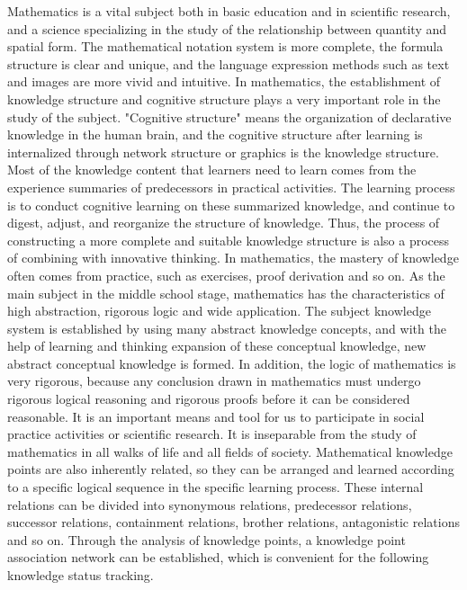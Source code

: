 Mathematics is a vital subject both in basic education and in scientific research, and a science specializing in the study of the relationship between quantity and spatial form. The mathematical notation system is more complete, the formula structure is clear and unique, and the language expression methods such as text and images are more vivid and intuitive. In mathematics, the establishment of knowledge structure and cognitive structure plays a very important role in the study of the subject. "Cognitive structure" means the organization of declarative knowledge in the human brain, and the cognitive structure after learning is internalized through network structure or graphics is the knowledge structure\cite{tanujaya2017relationship}. Most of the knowledge content that learners need to learn comes from the experience summaries of predecessors in practical activities. The learning process is to conduct cognitive learning on these summarized knowledge, and continue to digest, adjust, and reorganize the structure of knowledge. Thus, the process of constructing a more complete and suitable knowledge structure is also a process of combining with innovative thinking. In mathematics, the mastery of knowledge often comes from practice, such as exercises, proof derivation and so on. As the main subject in the middle school stage, mathematics has the characteristics of high abstraction, rigorous logic and wide application. The subject knowledge system is established by using many abstract knowledge concepts, and with the help of learning and thinking expansion of these conceptual knowledge, new abstract conceptual knowledge is formed. In addition, the logic of mathematics is very rigorous, because any conclusion drawn in mathematics must undergo rigorous logical reasoning and rigorous proofs before it can be considered reasonable. It is an important means and tool for us to participate in social practice activities or scientific research. It is inseparable from the study of mathematics in all walks of life and all fields of society. Mathematical knowledge points are also inherently related, so they can be arranged and learned according to a specific logical sequence in the specific learning process. These internal relations can be divided into synonymous relations, predecessor relations, successor relations, containment relations, brother relations, antagonistic relations and so on\cite{yang2019knowledgerelation}. Through the analysis of knowledge points, a knowledge point association network can be established, which is convenient for the following knowledge status tracking.

